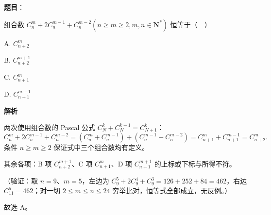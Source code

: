 \begin{answer}

\textbf{题目}：

组合数 \(C_{n}^{m}+2C_{n}^{m-1}+C_{n}^{m-2}\left(n\geqslant m\geqslant 2,m,n\in\mathbf{N}^{*}\right)\) 恒等于（　）

A. \(C_{n+2}^{m}\)

B. \(C_{n+2}^{m+1}\)

C. \(C_{n+1}^{m}\)

D. \(C_{n+1}^{m+1}\)

\textbf{解析}

两次使用组合数的 Pascal 公式 \(C_{N}^{k}+C_{N}^{k-1}=C_{N+1}^{k}\)：
\nopagebreak[4]
\[
C_{n}^{m}+2C_{n}^{m-1}+C_{n}^{m-2}=\left(C_{n}^{m}+C_{n}^{m-1}\right)+\left(C_{n}^{m-1}+C_{n}^{m-2}\right)=C_{n+1}^{m}+C_{n+1}^{m-1}=C_{n+2}^{m}.
\]
条件 \(n\geqslant m\geqslant2\) 保证式中三个组合数均有定义。

其余各项：B 项 \(C_{n+2}^{m+1}\)、C 项 \(C_{n+1}^{m}\)、D 项 \(C_{n+1}^{m+1}\) 的上标或下标与所得不符。

（验证：取 \(n=9\)、\(m=5\)，左边为 \(C_{9}^{5}+2C_{9}^{4}+C_{9}^{3}=126+252+84=462\)，右边 \(C_{11}^{5}=462\)；对一切 \(2\leqslant m\leqslant n\leqslant24\) 穷举比对，恒等式全部成立，无反例。）

故选 A。


\end{answer}
